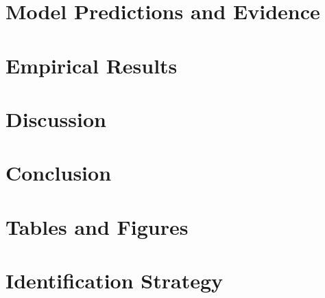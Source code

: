 \documentclass[12pt, a4paper]{article}
\theoremstyle{definition}   %
\begin{document}
\section{Model Predictions and Evidence} \label{sec:cross_section}


\section{Empirical Results} \label{sec:results}


\section{Discussion} \label{sec:discussion}
% 


\section{Conclusion}  \label{sec:conclusion}





\newpage
\clearpage


\appendix

\newpage
\appendix
\section{Tables and Figures}


\clearpage




\clearpage
\section{Identification Strategy}  \label{identification_appendix}

\end{document}
